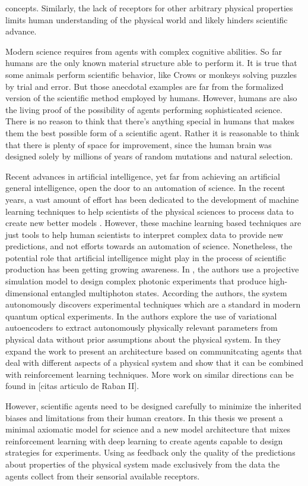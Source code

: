\documentclass[11pt,a4paper,twoside]{report}
\newcommand{\+}{\textnormal{+} }
\theoremstyle{definition}
\numberwithin{equation}{chapter}
\begin{document}
concepts. Similarly, the lack of receptors for other arbitrary physical
properties limits human understanding of the physical world and likely hinders
scientific advance. \\ 
\par 
Modern science requires from agents with complex cognitive abilities. So far
humans are the only known material structure able to perform it. It is true that
some animals perform scientific behavior, like Crows or monkeys solving puzzles
by trial and error. But those anecdotal examples are far from the formalized
version of the scientific method employed by humans. However, humans are also
the living proof of the possibility of agents performing sophisticated science.
There is no reason to think that there's anything special in humans that makes
them the best possible form of a scientific agent. Rather it is reasonable to
think that there is plenty of space for improvement, since the human brain was
designed solely by millions of years of random mutations and natural selection.

Recent advances in artificial intelligence, yet far from achieving an artificial
general intelligence, open the door to an automation of science. In the recent
years, a vast amount of effort has been dedicated to the development of machine
learning techniques to help scientists of the physical sciences to process data
to create new better models \cite{Carleo_2019}. However, these machine learning
based techniques are just tools to help human scientists to interpret complex
data to provide new predictions, and not efforts towards an automation of
science. Nonetheless, the potential role that artificial intelligence might play
in the process of scientific production has been getting growing awareness. In
\cite{Melnikov_2018}, the authors use a projective simulation model to design
complex photonic experiments that produce high-dimensional entangled multiphoton
states. According the authors, the system autonomously discovers experimental
techniques which are a standard in modern quantum optical experiments. In
\cite{iten2020discovering} the authors explore the use of variational
autoencoders to extract autonomously physically relevant parameters from
physical data without prior assumptions about the physical system. In
\cite{nautrup2020operationally} they expand the work to present an architecture
based on communitcating agents that deal with different aspects of a physical
system and show that it can be combined with reinforcement learning techniques.
More work on similar directions can be found in [citas articulo de Raban II].
\par
However, scientific agents need to be designed carefully to minimize the
inherited biases and limitations from their human creators. In this thesis we
present a minimal axiomatic model for science and a new model architecture that
mixes reinforcement learning with deep learning to create agents capable to
design strategies for experiments. Using as feedback only the quality of the
predictions about properties of the physical system made exclusively from the
data the agents collect from their sensorial available receptors. 
\end{document}
